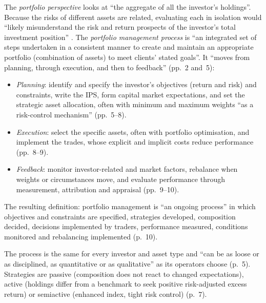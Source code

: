 \begin{qfdefinition}\label{def:portfolio-management-process}
 The \emph{portfolio perspective} looks at ``the aggregate of all the investor's holdings''. Because the risks of different assets are related, evaluating each in isolation would ``likely misunderstand the risk and return prospects of the investor's total investment position'' \citep[chap.~1, p.~4]{managing-investment-portfolios-2007}. The \emph{portfolio management process} is ``an integrated set of steps undertaken in a consistent manner to create and maintain an appropriate portfolio (combination of assets) to meet clients' stated goals''. It ``moves from planning, through execution, and then to feedback'' (pp.~2 and~5):
\begin{itemize}
\item \emph{Planning}: identify and specify the investor's objectives (return and risk) and constraints, write the IPS, form capital market expectations, and set the strategic asset allocation, often with minimum and maximum weights ``as a risk-control mechanism'' (pp.~5--8).
\item \emph{Execution}: select the specific assets, often with portfolio optimisation, and implement the trades, whose explicit and implicit costs reduce performance (pp.~8--9).
\item \emph{Feedback}: monitor investor-related and market factors, rebalance when weights or circumstances move, and evaluate performance through measurement, attribution and appraisal (pp.~9--10).
\end{itemize}
The resulting definition: portfolio management is ``an ongoing process'' in which objectives and constraints are specified, strategies developed, composition decided, decisions implemented by traders, performance measured, conditions monitored and rebalancing implemented (p.~10).

 The process is the same for every investor and asset type and ``can be as loose or as disciplined, as quantitative or as qualitative'' as its operators choose (p.~5). Strategies are passive (composition does not react to changed expectations), active (holdings differ from a benchmark to seek positive risk-adjusted excess return) or semiactive (enhanced index, tight risk control) (p.~7).


\end{qfdefinition}
